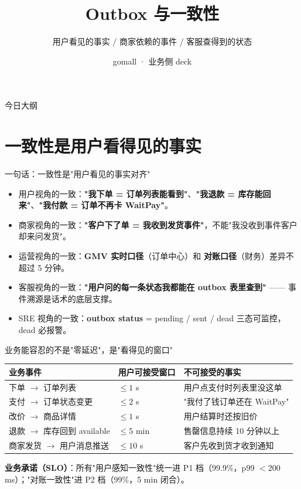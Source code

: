 \documentclass[aspectratio=169,11pt]{beamer}
\title{Outbox 与一致性}
\subtitle{用户看见的事实 / 商家依赖的事件 / 客服查得到的状态}
\author{gomall · 业务侧 deck}
\date{}
\begin{document}
\maketitle

\begin{frame}[shrink]{今日大纲}
\tableofcontents
\end{frame}

\section{一致性是用户看得见的事实}

\begin{frame}[shrink]{一句话：一致性是"用户看见的事实对齐"}
\begin{itemize}
  \item 用户视角的一致：\textbf{"我下单 = 订单列表能看到"}、\textbf{"我退款 = 库存能回来"}、\textbf{"我付款 = 订单不再卡 WaitPay"}。
  \item 商家视角的一致：\textbf{"客户下了单 = 我收到发货事件"}，不能"我没收到事件客户却来问发货"。
  \item 运营视角的一致：\textbf{GMV 实时口径}（订单中心）和 \textbf{对账口径}（财务）差异不超过 5 分钟。
  \item 客服视角的一致：\textbf{"用户问的每一条状态我都能在 outbox 表里查到"} —— 事件溯源是话术的底层支撑。
  \item SRE 视角的一致：\textbf{outbox status} = pending / sent / dead 三态可监控，dead 必报警。
\end{itemize}
\end{frame}

\begin{frame}[shrink]{业务能容忍的不是"零延迟"，是"看得见的窗口"}
\begin{tabular}{@{}lp{3.6cm}p{4.8cm}@{}}
\toprule
业务事件 & 用户可接受窗口 & 不可接受的事实 \\
\midrule
下单 $\to$ 订单列表       & $\leq 1$ s     & 用户点支付时列表里没这单 \\
支付 $\to$ 订单状态变更   & $\leq 2$ s     & "我付了钱订单还在 WaitPay" \\
改价 $\to$ 商品详情       & $\leq 1$ s     & 用户结算时还按旧价   \\
退款 $\to$ 库存回到 available & $\leq 5$ min & 售罄信息持续 10 分钟以上 \\
商家发货 $\to$ 用户消息推送 & $\leq 10$ s    & 客户先收到货才收到通知 \\
\bottomrule
\end{tabular}
\vspace{2mm}
\small \textbf{业务承诺（SLO）}：所有"用户感知一致性"统一进 P1 档（99.9\%，p99 $< 200$ ms）；"对账一致性"进 P2 档（99\%，5 min 闭合）。
\end{frame}
\end{document}
